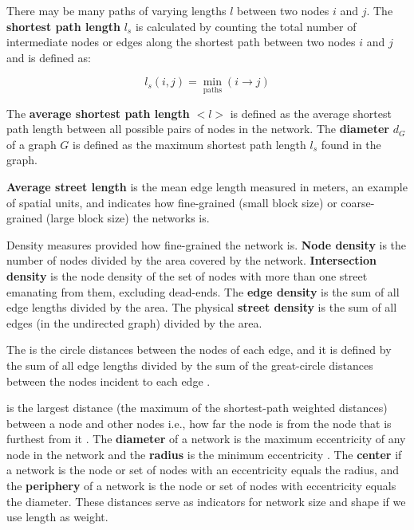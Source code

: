 There may be many paths of varying lengths $l$ between two nodes $i$ and $j$. The \textbf{shortest path length} $l_s$ is calculated by counting the total number of intermediate nodes or edges along the shortest path between two nodes $i$ and $j$ and is defined as:

\begin{equation} \label{eq:5}
	l_s(i,j) = \min_\text{paths}({i \to j})
\end{equation}

The \textbf{average shortest path length} $<l>$ is defined as the average shortest path length between all possible pairs of nodes in the network. The \textbf{diameter} $d_G$ of a graph $G$ is defined as the maximum shortest path length $l_s$ found in the graph.

\textbf{Average street length} is the mean edge length measured in meters, an example of spatial units, and indicates how fine-grained (small block size) or coarse-grained (large block size) the networks is.

Density measures provided how fine-grained the network is. \textbf{Node density} is the number of nodes divided by the area covered by the network. \textbf{Intersection density} is the node density of the set of nodes with more than one street emanating from them, excluding dead-ends. The \textbf{edge density} is the sum of all edge lengths divided by the area. The physical \textbf{street density} is the sum of all edges (in the undirected graph) divided by the area.

The  is the circle distances between the nodes of each edge, and it is defined by the sum of all edge lengths divided by the sum of the great-circle distances between the nodes incident to each edge \cite{giacomin-levinson_2015}.

  is the largest distance (the maximum of the shortest-path weighted distances) between a node and other nodes i.e., how far the node is from the node that is furthest from it \cite{urban-keitt_2001}. The \textbf{diameter} of a network is the maximum eccentricity of any node in the network and the \textbf{radius} is the minimum eccentricity \cite{hage-harary_1995}. The \textbf{center} if a network is the node or set of nodes with an eccentricity equals the radius, and the \textbf{periphery} of a network is the node or set of nodes with eccentricity equals the diameter. These distances serve as indicators for network size and shape if we use length as weight.

